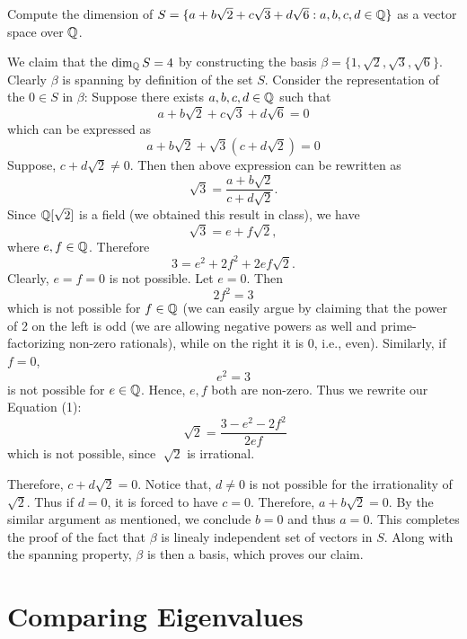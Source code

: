 \documentclass[11pt, a4paper, abstract=true]{scrartcl}
\begin{document}
\begin{problem*}
    Compute the dimension of \(S = \{a+b\sqrt{2} + c\sqrt{3} + d\sqrt{6} : a,b,c,d \in \mathbb Q\}\) as a vector space over \(\mathbb Q\).
\end{problem*}
\begin{soln}
    We claim that the \(\dim_{\mathbb Q}S = 4\) by constructing the basis \(\beta = \{1, \sqrt{2}, \sqrt{3}, \sqrt{6}\}\). \\ 
    Clearly \(\beta\) is spanning by definition of the set \(S\). Consider the representation of the \(0 \in S\) in \(\beta\): Suppose there exists \(a,b,c,d \in \mathbb Q\) such that \[a+b\sqrt{2} + c\sqrt{3} + d\sqrt{6} = 0\] which can be expressed as \[a+b\sqrt{2} + \sqrt{3}(c + d\sqrt{2}) = 0\] 
    Suppose, \(c+d\sqrt{2} \neq 0\). Then then above expression can be rewritten as \[\sqrt{3} = \frac{a+b\sqrt{2}}{c + d\sqrt{2}}.\] Since \(\mathbb Q[\sqrt{2}]\) is a field (we obtained this result in class), we have \[\sqrt{3} = e + f\sqrt{2},\] where \(e,f \in \mathbb Q\). Therefore 
    \begin{equation}
        3 = e^2 + 2f^2 + 2ef\sqrt{2}.
    \end{equation}
    Clearly, \(e = f = 0\) is not possible. Let \(e = 0\). Then  \[2f^2 = 3\] which is not possible for \(f \in \mathbb Q\) (we can easily argue by claiming that the power of 2 on the left is odd (we are allowing negative powers as well and prime-factorizing non-zero rationals), while on the right it is 0, i.e., even). Similarly, if \(f = 0\), \[e^2 = 3\] is not possible for \(e \in \mathbb Q\). Hence, \(e, f\) both are non-zero. Thus we rewrite our Equation (1): \[\sqrt[]{2} = \frac{3-e^2-2f^2}{2ef}\] which is not possible, since \(\sqrt[]{2}\) is irrational.

    Therefore, \(c + d\sqrt{2} = 0\). Notice that, \(d \neq 0\) is not possible for the irrationality of \(\sqrt{2}\). Thus if \(d = 0\), it is forced to have \(c = 0\). Therefore, \(a + b\sqrt{2} = 0\). By the similar argument as mentioned, we conclude \(b = 0\) and thus \(a = 0\). This completes the proof of the fact that \(\beta \) is linealy independent set of vectors in \(S\). Along with the spanning property, \(\beta\) is then a basis, which proves our claim.
\end{soln}

\newpage

\section{Comparing Eigenvalues}
\end{document}
